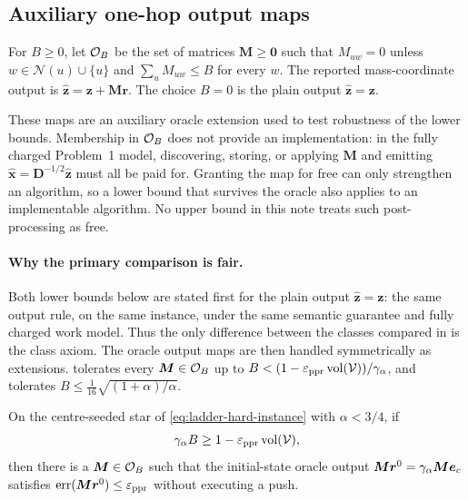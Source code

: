 \subsection*{Auxiliary one-hop output maps}

\begin{definition}
\label{def:ladder-output-maps}
For $B\ge0$, let $\mathcal{O}_{B}$ be the set of matrices $\bm{M}\ge\bm{0}$ such that
$M_{uw}=0$ unless $w\in\mathcal N(u)\cup\{u\}$ and
$\sum_u M_{uw}\le B$ for every $w$. The reported mass-coordinate output is
$\widehat{\bm{z}}=\bm{z}+\bm{M}\bm{r}$. The choice $B=0$ is the plain output
$\widehat{\bm{z}}=\bm{z}$.
\end{definition}

These maps are an auxiliary oracle extension used to test robustness of the
lower bounds. Membership in $\mathcal{O}_{B}$ does not provide an implementation: in the
fully charged Problem~1 model, discovering, storing, or applying $\bm{M}$ and
emitting $\widehat{\bm{x}}=\bm{D}^{-1/2}\widehat{\bm{z}}$ must all be paid
for. Granting the map for free can only strengthen an algorithm, so a lower
bound that survives the oracle also applies to an implementable algorithm.
No upper bound in this note treats such post-processing as free.

\paragraph{Why the primary comparison is fair.}
Both lower bounds below are stated first for the plain output
$\widehat{\bm{z}}=\bm{z}$: the same output rule, on the same instance, under
the same semantic guarantee and fully charged work model. Thus the only
difference between the classes compared in  is the
class axiom. The oracle output maps are then handled symmetrically as
extensions.  tolerates every
$\bm{M}\in\mathcal{O}_{B}$ up to
$B<(1-\varepsilon_{\mathrm{ppr}}\operatorname{vol}(\mathcal V))/\gamma_{\alpha}$, and
 tolerates
$B\le\tfrac{1}{16}\sqrt{(1+\alpha)/\alpha}$.

\begin{proposition}
\label{prop:ladder-escape}
On the centre-seeded star of \eqref{eq:ladder-hard-instance} with
$\alpha<3/4$, if
\begin{equation}
    \gamma_{\alpha} B\ge1-\varepsilon_{\mathrm{ppr}}\operatorname{vol}(\mathcal V),
    \label{eq:ladder-escape-threshold}
\end{equation}
then there is a $\bm{M}\in\mathcal{O}_{B}$ such that the initial-state oracle output
$\bm{M}\bm{r}^0=\gamma_{\alpha}\bm{M}\bm{e}_c$ satisfies
$\operatorname{err}(\bm{M}\bm{r}^0)\le\varepsilon_{\mathrm{ppr}}$ without executing a push.
\end{proposition}

